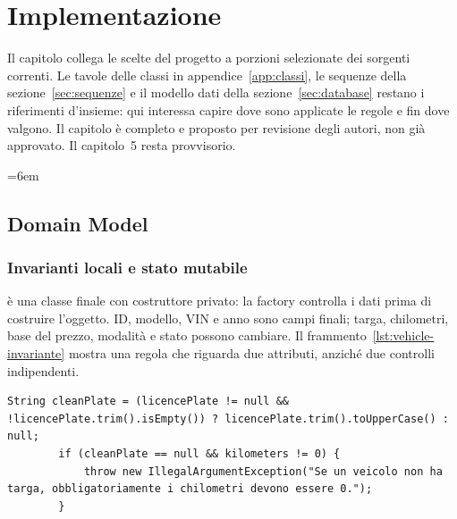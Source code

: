 \chapter{Implementazione}\label{ch:implementazione}
Il capitolo collega le scelte del progetto a porzioni selezionate dei sorgenti
correnti. Le tavole delle classi in appendice~\ref{app:classi}, le sequenze
della sezione~\ref{sec:sequenze} e il modello dati della
sezione~\ref{sec:database} restano i riferimenti d'insieme: qui interessa
capire dove sono applicate le regole e fin dove valgono.
Il capitolo è completo e proposto per revisione degli autori, non già
approvato. Il capitolo~5 resta provvisorio.

\begingroup
\emergencystretch=6em
\renewcommand{\lstlistingname}{Frammento}

\section{Domain Model}\label{sec:impl-dominio}
\subsection{Invarianti locali e stato mutabile}
 è una classe finale con costruttore privato: la factory
 controlla i dati prima di costruire l'oggetto. ID, modello,
VIN e anno sono campi finali; targa, chilometri, base del prezzo, modalità
e stato possono cambiare. Il frammento~\ref{lst:vehicle-invariante}
mostra una regola che riguarda due attributi, anziché due controlli
indipendenti.

\noindent\begin{minipage}{\linewidth}
\begin{lstlisting}[firstnumber=59,caption={\code{Vehicle.java}: normalizzazione della targa e coerenza con i chilometri.},
  label=lst:vehicle-invariante]
        String cleanPlate = (licencePlate != null && !licencePlate.trim().isEmpty()) ? licencePlate.trim().toUpperCase() : null;
        if (cleanPlate == null && kilometers != 0) {
            throw new IllegalArgumentException("Se un veicolo non ha targa, obbligatoriamente i chilometri devono essere 0.");
        }
\end{lstlisting}
\end{minipage}


